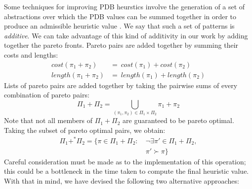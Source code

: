 \documentclass[letterpaper]{article} %
\begin{document}
Some techniques for improving PDB heurstics
involve the generation of a set of abstractions
over which the PDB values can be summed together
in order to produce an admissible heuristic value \cite{felner2004additive}.
We say that such a set of patterns is \textit{additive}.
We can take advantage of this kind of additivity in our work
by adding together the pareto fronts.
Pareto pairs are added together by summing their costs and lengths:
\begin{align*}
  cost(\pi_1 + \pi_2) &=\ cost(\pi_1) + cost(\pi_2)\\
  length(\pi_1 + \pi_2) &=\ length(\pi_1) + length(\pi_2)
\end{align*}
Lists of pareto pairs are added together by
taking the pairwise sums of every combination of pareto pairs:
\[\Pi_1 + \Pi_2 = \bigcup_{(\pi_1, \pi_2) \in \Pi_1 \times \Pi_2} \pi_1 + \pi_2 \]
Note that not all members of \(\Pi_1 + \Pi_2\) are guaranteed to be
pareto optimal. Taking the subset of pareto optimal pairs,
we obtain:
\begin{align*}
  \Pi_1 +^* \Pi_2 = \{\pi \in \Pi_1 + \Pi_2 :\ &\lnot \exists \pi' \in \Pi_1 + \Pi_2, \\
 &\pi' \succ \pi\}
\end{align*}
Careful consideration must be made as to the implementation of this operation;
this could be a bottleneck in the time taken to compute the final heuristic value.
With that in mind, we have devised the following two alternative approaches:
\end{document}
